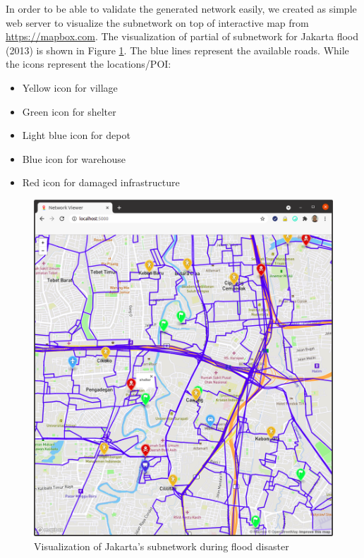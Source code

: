 \documentclass[conference]{IEEEtran}
\begin{document}
In order to be able to validate the generated network easily, we created as simple web server to visualize the subnetwork on top of interactive map from \url{https://mapbox.com}. The visualization of partial of subnetwork for Jakarta flood (2013) is shown in Figure \ref{fig_jakarta_subnetwork_visualized}. The blue lines represent the available roads. While the icons represent the locations/POI: 

\begin{itemize}
\item Yellow icon for village
\item Green icon for shelter
\item Light blue icon for depot
\item Blue icon for warehouse
\item Red icon for damaged infrastructure
\end{itemize}

\begin{figure}
\centerline{\includegraphics[scale=0.24]{subnetwork-visualization-zoom-1.png}}
\caption{Visualization of Jakarta's subnetwork during flood disaster}
\label{fig_jakarta_subnetwork_visualized}
\end{figure}
\end{document}

